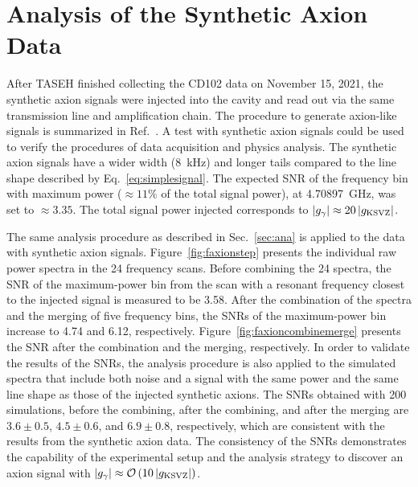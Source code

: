 \section{Analysis of the Synthetic Axion Data}\label{sec:faxion}
After TASEH finished collecting the CD102 data on November 15, 2021, 
the synthetic axion signals were injected into the cavity and read out via the 
same transmission line and amplification chain. The procedure 
to generate axion-like signals is summarized in 
Ref.~\cite{TASEHInstrumentation}. 
A test with synthetic axion signals could be used to verify the procedures of 
data acquisition and physics analysis. The synthetic axion signals 
have a wider width (8~kHz) and longer tails compared to the line shape 
described by Eq.~\eqref{eq:simplesignal}. 
The expected SNR of the frequency bin with maximum power ($\approx 11\%$ of 
the total signal power), 
 at 4.70897~GHz, was set to $\approx 3.35$. 
The total signal power injected 
corresponds to $\left|g_{\gamma}\right|\approx 20 \left|g_\text{KSVZ}\right|$. 

The same analysis procedure as described in Sec.~\ref{sec:ana} is applied 
to the data with synthetic axion signals. 
Figure~\ref{fig:faxionstep} presents the individual raw power spectra in 
the 24 frequency scans. Before combining 
the 24 spectra, the SNR of the maximum-power bin from the scan with a resonant 
frequency closest to the injected signal is measured to be 
3.58. 
After the combination of the spectra and the merging of five frequency 
bins, the SNRs of the maximum-power bin increase to 4.74 and 6.12, 
respectively. Figure~\ref{fig:faxioncombinemerge} presents 
the SNR after the combination and the merging, respectively.    
In order to 
validate the results of the SNRs, the analysis procedure is also applied  
to the simulated spectra that include both noise and a signal with the 
same power and the same line shape as those of the injected synthetic axions. 
The SNRs obtained with 200 simulations, before 
the combining, after the combining, and after the merging are %
$3.6\pm 0.5$, $4.5\pm0.6$, and $6.9\pm0.8$, respectively, 
which are 
consistent with the results from the synthetic axion data.  
The consistency of the SNRs demonstrates 
the capability of the experimental setup and the analysis strategy to discover 
an axion signal with 
$\left|g_{\gamma}\right|\approx {\cal O}\left(10\left|g_\text{KSVZ}\right|\right)$.


